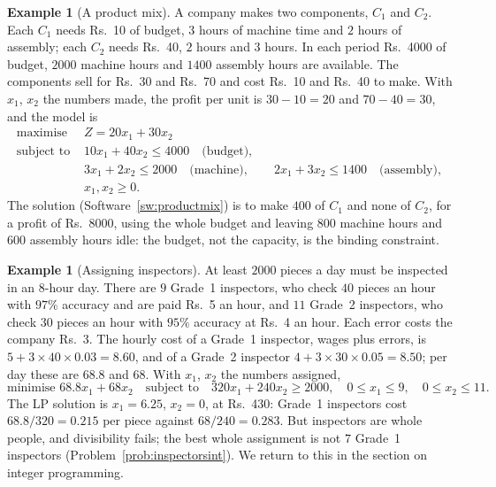 \documentclass[11pt,a4paper]{article}
\numberwithin{equation}{section}
\theoremstyle{definition}
\newtheorem{exa}[thm]{Example}
\begin{document}
\begin{exa}[A product mix]
\label{ex:components}
A company makes two components, $C_1$ and $C_2$. Each $C_1$ needs Rs.~10 of budget, $3$ hours of machine time and $2$ hours of assembly; each $C_2$ needs Rs.~40, $2$ hours and $3$ hours. In each period Rs.~4000 of budget, $2000$ machine hours and $1400$ assembly hours are available. The
components sell for Rs.~30 and Rs.~70 and cost Rs.~10 and Rs.~40 to make. With $x_1$, $x_2$ the numbers made, the profit per unit is $30 - 10 = 20$ and $70 - 40 = 30$, and the model is
\[
\begin{aligned}
\text{maximise } & Z = 20x_1 + 30x_2 \\
\text{subject to } & 10x_1 + 40x_2 \leq 4000 \quad\text{(budget)}, \\
& 3x_1 + 2x_2 \leq 2000 \quad\text{(machine)}, \qquad 2x_1 + 3x_2 \leq 1400 \quad\text{(assembly)}, \\
& x_1, x_2 \geq 0 .
\end{aligned}
\]
The solution (Software~\ref{sw:productmix}) is to make $400$ of $C_1$ and none of $C_2$, for a profit of Rs.~8000, using the whole budget and leaving $800$ machine hours and $600$ assembly hours idle: the budget, not the capacity, is the binding constraint.
\end{exa}

\begin{exa}[Assigning inspectors]
\label{ex:inspectors}
At least $2000$ pieces a day must be inspected in an $8$-hour day. There are $9$ Grade~1 inspectors, who check $40$ pieces an hour with $97\%$ accuracy and are paid Rs.~5 an hour, and $11$ Grade~2 inspectors, who check $30$ pieces an hour with $95\%$ accuracy at Rs.~4 an hour. Each error costs the
company Rs.~3. The hourly cost of a Grade~1 inspector, wages plus errors, is $5 + 3 \times 40 \times 0.03 = 8.60$, and of a Grade~2 inspector $4 + 3 \times 30 \times 0.05 = 8.50$; per day these are $68.8$ and $68$. With $x_1$, $x_2$ the numbers assigned,
\[
\text{minimise } 68.8x_1 + 68x_2 \quad\text{subject to}\quad 320x_1 + 240x_2 \geq 2000, \quad 0 \leq x_1 \leq 9, \quad 0 \leq x_2 \leq 11 .
\]
The LP solution is $x_1 = 6.25$, $x_2 = 0$, at Rs.~430: Grade~1 inspectors cost $68.8/320 = 0.215$ per piece against $68/240 = 0.283$. But inspectors are whole people, and divisibility fails; the best whole assignment is not $7$ Grade~1 inspectors (Problem~\ref{prob:inspectorsint}). We return to this in the section on integer programming.
\end{exa}
\end{document}
